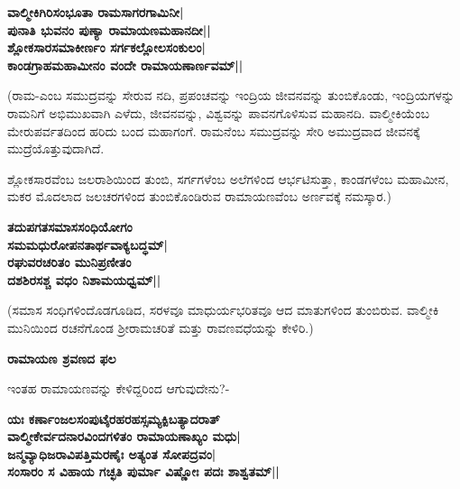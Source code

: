 \begin{center} 

{\bf ವಾಲ್ಮೀಕಿಗಿರಿಸಂಭೂತಾ ರಾಮಸಾಗರಗಾಮಿನೀ|\\ 

ಪುನಾತಿ ಭುವನಂ ಪುಣ್ಯಾ ರಾಮಾಯಣಮಹಾನದೀ||\\ 

ಶ್ಲೋಕಸಾರಸಮಾಕೀರ್ಣಂ ಸರ್ಗಕಲ್ಲೋಲಸಂಕುಲಂ|\\ 

ಕಾಂಡಗ್ರಾಹಮಹಾಮೀನಂ ವಂದೇ ರಾಮಾಯಣಾರ್ಣವಮ್‍||} 

\end{center} 


(ರಾಮ-ಎಂಬ ಸಮುದ್ರವನ್ನು ಸೇರುವ ನದಿ, ಪ್ರಪಂಚವನ್ನು ಇಂದ್ರಿಯ ಜೀವನವನ್ನು ತುಂಬಿಕೊಂಡು, ಇಂದ್ರಿಯಗಳನ್ನು ರಾಮನಿಗೆ ಅಭಿಮುಖವಾಗಿ ಎಳೆದು, ಜೀವನವನ್ನು, ವಿಶ್ವವನ್ನು ಪಾವನಗೊಳಿಸುವ ಮಹಾನದಿ. ವಾಲ್ಮೀಕಿಯೆಂಬ ಮೇರುಪರ್ವತದಿಂದ ಹರಿದು ಬಂದ ಮಹಾಗಂಗೆ. ರಾಮನೆಂಬ ಸಮುದ್ರವನ್ನು ಸೇರಿ ಅಮುದ್ರವಾದ ಜೀವನಕ್ಕೆ ಮುದ್ರೆಯೊತ್ತುವುದಾಗಿದೆ. 


ಶ್ಲೋಕಸಾರವೆಂಬ ಜಲರಾಶಿಯಿಂದ ತುಂಬಿ, ಸರ್ಗಗಳೆಂಬ ಅಲೆಗಳಿಂದ ಆರ್ಭಟಿಸುತ್ತಾ, ಕಾಂಡಗಳೆಂಬ ಮಹಾಮೀನ, ಮಕರ ಮೊದಲಾದ ಜಲಚರಗಳಿಂದ ತುಂಬಿಕೊಂಡಿರುವ ರಾಮಾಯಣವೆಂಬ ಅರ್ಣವಕ್ಕೆ ನಮಸ್ಕಾರ.) 


\begin{center} 

{\bf ತದುಪಗತಸಮಾಸಸಂಧಿಯೋಗಂ\\ 

ಸಮಮಧುರೋಪನತಾರ್ಥವಾಕ್ಯಬದ್ಧಮ್‍|\\ 

ರಘುವರಚರಿತಂ ಮುನಿಪ್ರಣೀತಂ\\ 

ದಶಶಿರಸಶ್ಚ ವಧಂ ನಿಶಾಮಯಧ್ವಮ್‍||} 

\end{center} 


(ಸಮಾಸ ಸಂಧಿಗಳಿಂದೊಡಗೂಡಿದ, ಸರಳವೂ ಮಾಧುರ್ಯಭರಿತವೂ ಆದ ಮಾತುಗಳಿಂದ ತುಂಬಿರುವ. ವಾಲ್ಮೀಕಿ ಮುನಿಯಿಂದ ರಚನೆಗೊಂಡ ಶ್ರೀರಾಮಚರಿತೆ ಮತ್ತು ರಾವಣವಧೆಯನ್ನು ಕೇಳಿರಿ.) 


{\bf ರಾಮಾಯಣ ಶ್ರವಣದ ಫಲ} 


ಇಂತಹ ರಾಮಾಯಣವನ್ನು ಕೇಳಿದ್ದರಿಂದ ಆಗುವುದೇನು?- 


\begin{center} 

{\bf ಯಃ ಕರ್ಣಾಂಜಲಸಂಪುಟೈರಹರಹಸ್ಸಮ್ಯಕ್ಪಿಬತ್ಯಾದರಾತ್‍\\ 

ವಾಲ್ಮೀಕೇರ್ವದನಾರವಿಂದಗಳಿತಂ ರಾಮಾಯಣಾಖ್ಯಂ ಮಧು|\\ 

ಜನ್ಮವ್ಯಾಧಿಜರಾವಿಪತ್ತಿಮರಣೈಃ ಅತ್ಯಂತ ಸೋಪದ್ರವಂ|\\ 

ಸಂಸಾರಂ ಸ ವಿಹಾಯ ಗಚ್ಛತಿ ಪುರ್ಮಾ ವಿಷ್ಣೋಃ ಪದಃ ಶಾಶ್ವತಮ್‍||} 

\end{center} 


